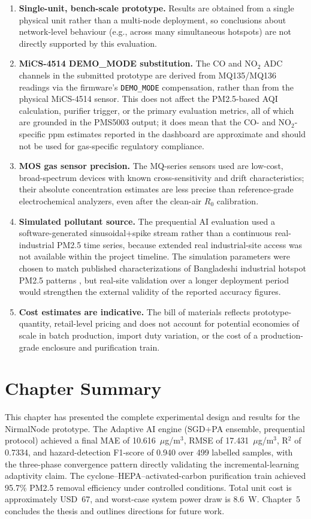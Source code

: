 \begin{enumerate}
    \item \textbf{Single-unit, bench-scale prototype.} Results are obtained from a single physical unit rather than a multi-node deployment, so conclusions about network-level behaviour (e.g., across many simultaneous hotspots) are not directly supported by this evaluation.
    \item \textbf{MiCS-4514 DEMO\_MODE substitution.} The CO and NO$_2$ ADC channels in the submitted prototype are derived from MQ135/MQ136 readings via the firmware's \texttt{DEMO\_MODE} compensation, rather than from the physical MiCS-4514 sensor. This does not affect the PM2.5-based AQI calculation, purifier trigger, or the primary evaluation metrics, all of which are grounded in the PMS5003 output; it does mean that the CO- and NO$_2$-specific ppm estimates reported in the dashboard are approximate and should not be used for gas-specific regulatory compliance.
    \item \textbf{MOS gas sensor precision.} The MQ-series sensors used are low-cost, broad-spectrum devices with known cross-sensitivity and drift characteristics; their absolute concentration estimates are less precise than reference-grade electrochemical analyzers, even after the clean-air $R_0$ calibration.
    \item \textbf{Simulated pollutant source.} The prequential AI evaluation used a software-generated sinusoidal+spike stream rather than a continuous real-industrial PM2.5 time series, because extended real industrial-site access was not available within the project timeline. The simulation parameters were chosen to match published characterizations of Bangladeshi industrial hotspot PM2.5 patterns \citep{basak2025spatial,ali2025longterm}, but real-site validation over a longer deployment period would strengthen the external validity of the reported accuracy figures.
    \item \textbf{Cost estimates are indicative.} The bill of materials reflects prototype-quantity, retail-level pricing and does not account for potential economies of scale in batch production, import duty variation, or the cost of a production-grade enclosure and purification train.
\end{enumerate}

\section{Chapter Summary}
\label{sec:exp-summary}

This chapter has presented the complete experimental design and results for the NirmalNode prototype. The Adaptive AI engine (SGD+PA ensemble, prequential protocol) achieved a final MAE of 10.616~$\mu$g/m$^3$, RMSE of 17.431~$\mu$g/m$^3$, R$^2$ of 0.7334, and hazard-detection F1-score of 0.940 over 499 labelled samples, with the three-phase convergence pattern directly validating the incremental-learning adaptivity claim. The cyclone--HEPA--activated-carbon purification train achieved 95.7\% PM2.5 removal efficiency under controlled conditions. Total unit cost is approximately USD~67, and worst-case system power draw is 8.6~W. Chapter~5 concludes the thesis and outlines directions for future work.
